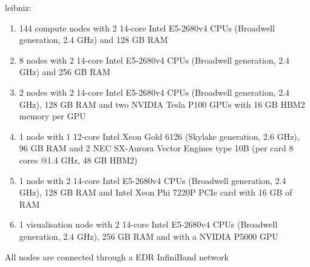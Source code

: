 leibniz:
  \begin{enumerate}
  \item 144 compute nodes with 2 14-core Intel E5-2680v4 CPUs (Broadwell generation, 2.4 GHz) and 128 GB RAM
  \item 8 nodes with 2 14-core Intel E5-2680v4 CPUs (Broadwell generation, 2.4 GHz) and 256 GB RAM
  \item 2 nodes with 2 14-core Intel E5-2680v4 CPUs (Broadwell generation, 2.4 GHz), 128 GB RAM and two NVIDIA Tesla P100 GPUs with 16 GB HBM2 memory per GPU
  \item 1 node with 1 12-core Intel Xeon Gold 6126 (Skylake generation, 2.6 GHz), 96 GB RAM and 2 NEC SX-Aurora Vector Engines type 10B (per card 8 cores @1.4 GHz, 48 GB HBM2)
  \item 1 node with 2 14-core Intel E5-2680v4 CPUs (Broadwell generation, 2.4 GHz), 128 GB RAM and Intel Xeon Phi 7220P PCIe card with 16 GB of RAM
  \item 1 visualisation node with 2 14-core Intel E5-2680v4 CPUs (Broadwell generation, 2.4 GHz), 256 GB RAM and with a NVIDIA P5000 GPU
  \end{enumerate}
All nodes are connected through a EDR InfiniBand network
\fi
\ifleuven
